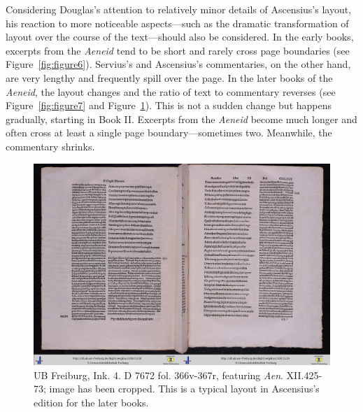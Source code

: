 \documentclass{dhbenelux}
\begin{document}
Considering Douglas's attention to relatively minor details of
Ascensius's layout, his reaction to more noticeable aspects---such as
the dramatic transformation of layout over the course of the
text---should also be considered. In the early books, excerpts from the
\emph{Aeneid} tend to be short and rarely cross page boundaries (see
Figure~\ref{fig:figure6}). Servius's and Ascensius's commentaries, on the other hand,
are very lengthy and frequently spill over the page. In the later books
of the \emph{Aeneid}, the layout changes and the ratio of text to
commentary reverses (see Figure~\ref{fig:figure7} and Figure~\ref{fig:figure8}). This is not a sudden change but
happens gradually, starting in Book II. Excerpts from the \emph{Aeneid}
become much longer and often cross at least a single page
boundary---sometimes two. Meanwhile, the commentary shrinks.

\pagebreak
\enlargethispage{\baselineskip}
\begin{figure}[H]
\begin{center}
\includegraphics[width=1\linewidth]{Images/Figure8.jpg}
\end{center}
\caption{UB Freiburg, Ink. 4. D 7672 fol. 366v-367r, featuring \emph{Aen}. XII.425-73; image has been cropped.  This is a typical layout in Ascensius’s edition for the later books.}
\label{fig:figure8}
\end{figure}
\end{document}
